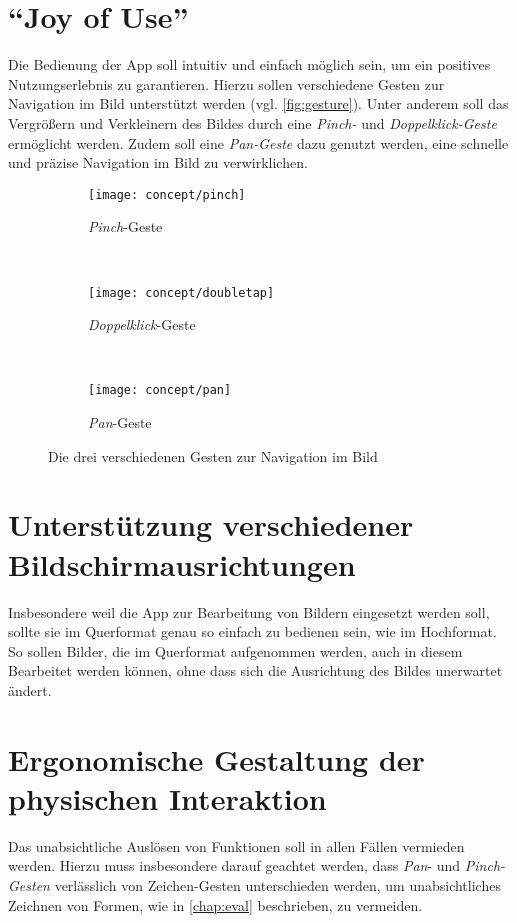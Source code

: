 \section{``Joy of Use''}
Die Bedienung der App soll intuitiv und einfach möglich sein, um ein positives Nutzungserlebnis zu garantieren.
Hierzu sollen verschiedene Gesten zur Navigation im Bild unterstützt werden (vgl. \autoref{fig:gesture}).
Unter anderem soll das Vergrößern und Verkleinern des Bildes durch eine \emph{Pinch-} und \emph{Doppelklick-Geste} ermöglicht werden.
Zudem soll eine \emph{Pan-Geste} dazu genutzt werden, eine schnelle und präzise Navigation im Bild zu verwirklichen.
\begin{figure}[h]
  \begin{subfigure}[t]{0.3\textwidth}
    \centering
    \texttt{[image: concept/pinch]}
    \caption{\emph{Pinch}-Geste}
  \end{subfigure}
  ~
  \begin{subfigure}[t]{0.3\textwidth}
    \centering
    \texttt{[image: concept/doubletap]}
    \caption{\emph{Doppelklick}-Geste}
  \end{subfigure}
  ~
  \begin{subfigure}[t]{0.3\textwidth}
    \centering
    \texttt{[image: concept/pan]}
    \caption{\emph{Pan}-Geste}
  \end{subfigure}
  \centering
  \caption{Die drei verschiedenen Gesten zur Navigation im Bild}
  \label{fig:gesturea}
\end{figure}

\section{Unterstützung verschiedener Bildschirmausrichtungen}
Insbesondere weil die App zur Bearbeitung von Bildern eingesetzt werden soll, sollte sie im Querformat genau so einfach zu bedienen sein, wie im Hochformat.
So sollen Bilder, die im Querformat aufgenommen werden, auch in diesem Bearbeitet werden können, ohne dass sich die Ausrichtung des Bildes unerwartet ändert.

\section{Ergonomische Gestaltung der physischen Interaktion}
Das unabsichtliche Auslösen von Funktionen soll in allen Fällen vermieden werden.
Hierzu muss insbesondere darauf geachtet werden, dass \emph{Pan}- und \emph{Pinch-Gesten} verlässlich von Zeichen-Gesten unterschieden werden, um unabsichtliches Zeichnen von Formen, wie in \autoref{chap:eval} beschrieben, zu vermeiden.

